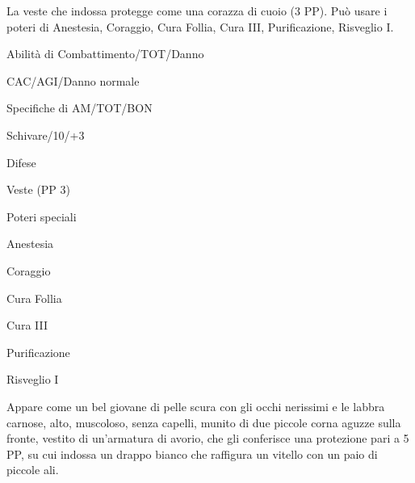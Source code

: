 La veste che indossa protegge come
una corazza di cuoio (3 PP). Pu\`o usare i poteri di Anestesia, Coraggio,
Cura Follia, Cura III, Purificazione, Risveglio I.


\begin{parmostro}{Abilit\`a di Combattimento/TOT/Danno}
\item CAC/AGI/Danno normale
\end{parmostro}

\begin{parmostro}{Specifiche di AM/TOT/BON}
\item Schivare/10/+3
\end{parmostro}

\begin{parmostro}{Difese}
\item Veste (PP 3)
\end{parmostro}

\begin{parmostro}{Poteri speciali}
\item Anestesia
\item Coraggio
\item Cura Follia
\item Cura III
\item Purificazione
\item Risveglio I
\end{parmostro}





Appare come un bel giovane di pelle scura con gli occhi nerissimi e le
labbra carnose, alto, muscoloso, senza capelli, munito di due piccole
corna aguzze sulla fronte, vestito di un'armatura di avorio, che gli
conferisce una protezione pari a 5 PP, su cui indossa un drappo bianco
che raffigura un vitello con un paio di piccole ali.

